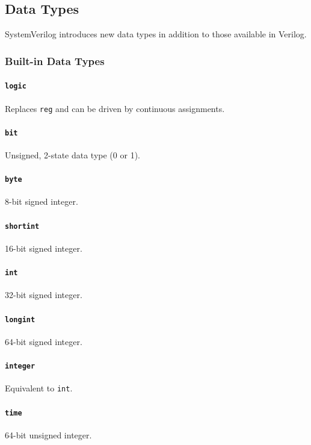 \subsection{Data Types}
SystemVerilog introduces new data types in addition to those available in Verilog.

\subsubsection{Built-in Data Types}
\paragraph{\texttt{logic}} Replaces \texttt{reg} and can be driven by continuous assignments.

\paragraph{\texttt{bit}} Unsigned, 2-state data type (0 or 1).

\paragraph{\texttt{byte}} 8-bit signed integer.

\paragraph{\texttt{shortint}} 16-bit signed integer.

\paragraph{\texttt{int}} 32-bit signed integer.

\paragraph{\texttt{longint}} 64-bit signed integer.

\paragraph{\texttt{integer}} Equivalent to \texttt{int}.

\paragraph{\texttt{time}} 64-bit unsigned integer.

